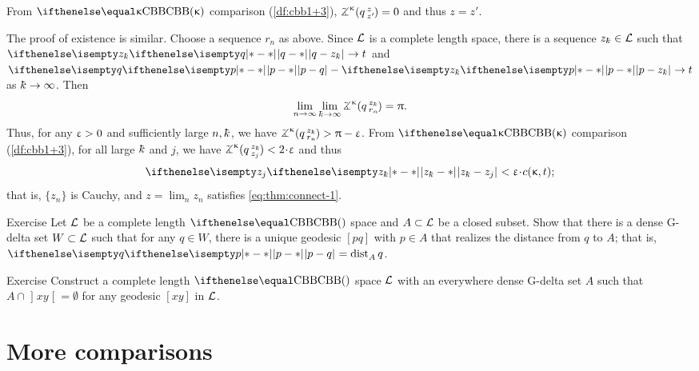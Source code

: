 From $\Alex\kappa$ comparison (\ref{df:cbb1+3}), $\angk\kappa q z {z'}=0$ and thus $z=z'$.

The proof of existence is similar.
Choose a sequence $r_n$ as above.
Since $\mathcal{L}$ is a complete length space, 
there is a sequence $z_\kay\in \spc{L}$ such that $\dist{q}{z_\kay}{}\to t$ and $\dist{p}{q}{}-\dist{p}{z_\kay}{}\to t$ as $\kay\to\infty$.
Then 
\[
\lim_{n\to\infty}
\lim_{\kay\to\infty}
\angk\kappa q{z_\kay}{r_n}
=\pi.\] 
Thus, for any $\upvarepsilon>0$ and sufficiently large $n,\kay$, we have $\angk\kappa q{z_\kay}{r_n}\z>\pi-\eps$.
From $\Alex\kappa$ comparison (\ref{df:cbb1+3}), for all large $\kay$ and $j$, we have $\angk\kappa q{z_\kay}{z_j}\z<2\cdot\eps$ and thus 
\[\dist{z_\kay}{z_j}{}<\eps\cdot\Const(\kappa,t);\]
that is, $\{z_n\}$ is Cauchy, and $z=\lim_n z_n$ satisfies \ref{eq:thm:connect-1}.
\qeds

\begin{thm}{Exercise}\label{ex:almost.geod}
Let $\mathcal{L}$ be a complete length $\Alex{}$ space and $A\subset\spc{L}$ be a closed subset.
Show that there is a dense G-delta set $W\subset\spc{L}$ such that
for any $q\in W$, there is a unique geodesic $[pq]$ with
$p\in A$ that realizes the distance from $q$ to $A$; that is, $\dist{p}{q}{}=\distfun{A}{q}{}$.
\end{thm}

\begin{thm}{Exercise}\label{ex:G-delta-not-thru}
Construct a complete length $\Alex{}$ space $\mathcal{L}$
with an everywhere dense G-delta set $A$
such that 
$A\cap \mathopen{]}xy\mathclose{[}=\emptyset$
for any geodesic $[xy]$ in $\mathcal{L}$. 
\end{thm}


\section{More comparisons}\label{sec:more-angles}

